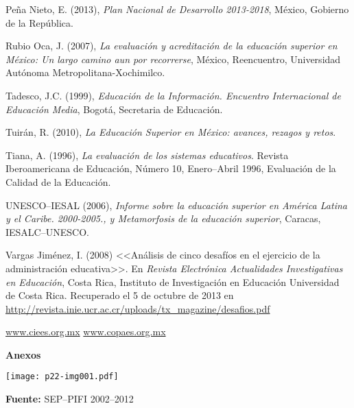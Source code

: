Peña Nieto, E. (2013), \textit{Plan Nacional de
Desarrollo 2013-2018}, México, Gobierno de la República.

 
Rubio Oca, J. (2007), \textit{La evaluación y acreditación de la educación
superior en México: Un largo camino aun por recorrerse}, México,
Reencuentro, Universidad Autónoma Metropolitana-Xochimilco. 

 
Tadesco, J.C. (1999), \textit{Educación de la Información. Encuentro
Internacional de Educación Media}, Bogotá, Secretaria de Educación.

 
Tuirán, R. (2010), \textit{La Educación Superior en México: avances,
rezagos y retos}. 

 
Tiana, A. (1996), \textit{La evaluación de los sistemas educativos}.
Revista Iberoamericana de Educación, Número 10, Enero--Abril 1996,
Evaluación de la Calidad de la Educación.


UNESCO--IESAL  (2006), \textit{Informe sobre la educación superior en
América Latina y el Caribe. 2000-2005., y  Metamorfosis de la
educación superior}, Caracas, IESALC--UNESCO.

\begin{sloppypar} 
Vargas Jiménez, I. (2008) <<Análisis de cinco desafíos en el ejercicio de
la administración educativa>>. En \textit{Revista Electrónica Actualidades
Investigativas en Educación}, Costa Rica, Instituto de Investigación en
Educación Universidad de Costa Rica. Recuperado el 5 de octubre de 2013 en 
\url{http://revista.inie.ucr.ac.cr/uploads/tx_magazine/desafios.pdf}
\end{sloppypar}
 
\href{http://www.ciees.org.mx/}{\url{www.ciees.org.mx}}\newline 
\href{http://www.copaes.org.mx/}{\url{www.copaes.org.mx}}
\newpage

\begin{center} 
\textbf{Anexos}

\vspace{2in}
\texttt{[image: p22-img001.pdf]} 
\end{center}
{\scriptsize {\bfseries Fuente:} SEP--PIFI 2002--2012}
\newpage

\begin{mdframed}[userdefinedwidth=3.4in,align=center,
linecolor=blue,linewidth=3pt]
\begin{figure}[H]
\begin{minipage}{3in}

\end{minipage}
\end{figure}
\end{mdframed}

